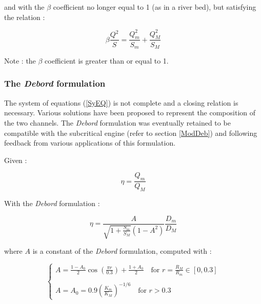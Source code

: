 and with the $\beta$ coefficient no longer equal to 1 (as in a river bed), but satisfying the relation :

\begin{equation}
 \beta \frac{Q^2}{S} = \frac{Q_{m}^2}{S_m} + \frac{Q_{M}^2}{S_M}
\end{equation}

\begin{CommentBlock}{Note :}
the $\beta$ coefficient is greater than or equal to 1.
\end{CommentBlock}

\subsubsection{The \emph{Debord} formulation}

The system of equations (\ref{SyEQ}) is not complete and a closing relation is necessary. Various solutions have been proposed to represent the composition of the two channels. The \emph{Debord} formulation was eventually retained to be compatible with the subcritical engine (refer to section \ref{ModDeb}) and following feedback from various applications of this formulation.

Given :

\begin{equation}
 \eta = \frac{Q_m}{Q_M}
\end{equation}

With the \emph{Debord} formulation :

\begin{equation}
 \eta = \frac{A}{\displaystyle \sqrt{1+\frac{S_m}{S_M}}(1-A^2)} \frac{D_m}{D_M}
\end{equation}

where $A$ is a constant of the \emph{Debord} formulation, computed with :

\begin{equation}
 \left \lbrace
  \begin{array}{l}
    A = \frac{1-A_0}{2}\cos \left ( \frac{\pi r}{0.3} \right ) + \frac{1+A_0}{2} \quad \mbox{for } r=\frac{R_M}{R_m} \in [0,0.3] \\
    \\
    A = A_0 = 0.9 \left ( \frac{K_m}{K_M} \right )^{-1/6} \quad \mbox{for } r > 0.3
  \end{array}
 \right.
\end{equation}

